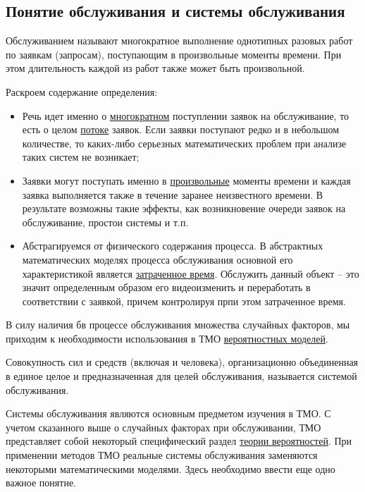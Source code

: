 
\subsection{Понятие обслуживания и системы обслуживания}

\begin{definition}
	{\color{red}Обслуживанием} называют многократное выполнение однотипных разовых работ по заявкам (запросам), поступающим в произвольные моменты времени. При этом длительность каждой из работ также может быть произвольной.
\end{definition}

Раскроем содержание определения:
\begin{itemize}
	\item Речь идет именно о \underline{многократном} поступлении заявок на обслуживание, то есть о целом \underline{потоке} заявок. Если заявки поступают редко и в небольшом количестве, то каких-либо серьезных математических проблем при анализе таких систем не возникает;
	\item Заявки могут поступать именно в \underline{произвольные} моменты времени и каждая заявка выполняется также в течение заранее неизвестного времени. В результате возможны такие эффекты, как возникновение очереди заявок на обслуживание, простои системы и т.п.
	\item Абстрагируемся от физического содержания процесса. В абстрактных математических моделях процесса обслуживания основной его характеристикой является \underline{затраченное время}. Обслужить данный объект -- это значит определенным образом его видеоизменить и переработать в соответствии с заявкой, причем контролируя прпи этом затраченное время.
\end{itemize}

В силу наличия бв процессе обслуживания множества случайных факторов, мы приходим к необходимости использования в ТМО \underline{вероятностных моделей}.

\begin{definition}
	Совокупность сил и средств (включая и человека), организационно объединенная в единое целое и предназначенная для целей обслуживания, называется {\color{red}системой обслуживания}.
\end{definition}

Системы обслуживания являются основным предметом изучения в ТМО. С учетом сказанного выше о случайных факторах при обслуживании, ТМО представляет собой некоторый специфический раздел \underline{теории вероятностей}. При применении методов ТМО реальные системы обслуживания заменяются некоторыми математическими моделями. Здесь необходимо ввести еще одно важное понятие.

